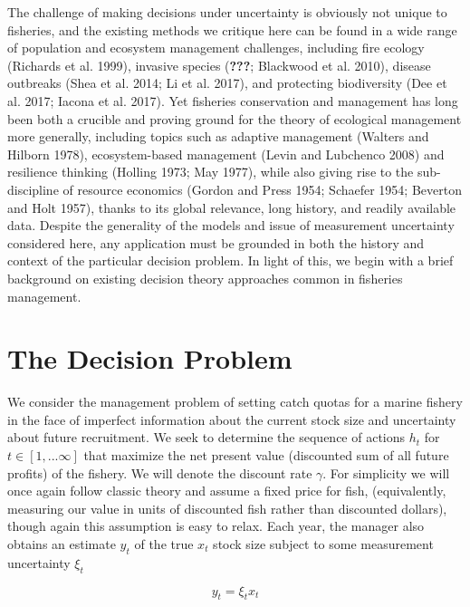 \documentclass[3p]{elsarticle} %
\begin{document}
The challenge of making decisions under uncertainty is obviously not
unique to fisheries, and the existing methods we critique here can be
found in a wide range of population and ecosystem management challenges,
including fire ecology (Richards et al. 1999), invasive species
({\textbf{???}}; Blackwood et al. 2010), disease outbreaks (Shea et al.
2014; Li et al. 2017), and protecting biodiversity (Dee et al. 2017;
Iacona et al. 2017). Yet fisheries conservation and management has long
been both a crucible and proving ground for the theory of ecological
management more generally, including topics such as adaptive management
(Walters and Hilborn 1978), ecosystem-based management (Levin and
Lubchenco 2008) and resilience thinking (Holling 1973; May 1977), while
also giving rise to the sub-discipline of resource economics (Gordon and
Press 1954; Schaefer 1954; Beverton and Holt 1957), thanks to its global
relevance, long history, and readily available data. Despite the
generality of the models and issue of measurement uncertainty considered
here, any application must be grounded in both the history and context
of the particular decision problem. In light of this, we begin with a
brief background on existing decision theory approaches common in
fisheries management.

\hypertarget{the-decision-problem}{%
\section{The Decision Problem}\label{the-decision-problem}}

We consider the management problem of setting catch quotas for a marine
fishery in the face of imperfect information about the current stock
size and uncertainty about future recruitment. We seek to determine the
sequence of actions \(h_t\) for \(t \in [1, ... \infty]\) that maximize
the net present value (discounted sum of all future profits) of the
fishery. We will denote the discount rate \(\gamma\). For simplicity we
will once again follow classic theory and assume a fixed price for fish,
(equivalently, measuring our value in units of discounted fish rather
than discounted dollars), though again this assumption is easy to relax.
Each year, the manager also obtains an estimate \(y_t\) of the true
\(x_t\) stock size subject to some measurement uncertainty \(\xi_t\)

\begin{equation}
y_t = \xi_t x_t 
\end{equation}
\end{document}
